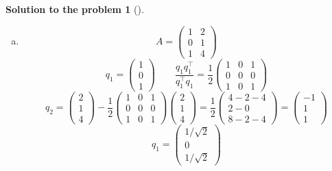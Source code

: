 \documentclass[12pt,a4]{article}
\newtheorem{solution}{Solution to the problem}
\begin{document}
\begin{solution}[]
\begin{enumerate}[(a)]
\[\begin{pmatrix}
\end{pmatrix}
\]
\[
\Rightarrow A = 
\begin{pmatrix}
1 & -1 \\
2 & 3
\end{pmatrix}
=
\begin{pmatrix}
1/\sqrt5 & -2/\sqrt5 \\
2/\sqrt5 & 1/\sqrt5
\end{pmatrix}
\begin{pmatrix}
\sqrt 5 & \sqrt 5 \\
0 & \sqrt 5 \\
\end{pmatrix}
\]
\item
\[
A =
\begin{pmatrix}
1 & 2 \\
0 & 1 \\
1 & 4 \end{pmatrix}
\]
\[
q_1 = \begin{pmatrix} 1 \\ 0 \\ 1  \end{pmatrix}
\qquad
\frac{q_1 q_1^\top}{q_1^\top q_1} =
\frac{1}{2}
\begin{pmatrix} 1 & 0 & 1 \\ 0 & 0 & 0 \\ 1 & 0 & 1 \end{pmatrix}
\]
\[
q_2 = \begin{pmatrix} 2 \\ 1 \\ 4  \end{pmatrix} -
\frac{1}{2}
\begin{pmatrix} 1 & 0 & 1 \\ 0 & 0 & 0 \\ 1 & 0 & 1 \end{pmatrix}
\begin{pmatrix} 2 \\ 1 \\ 4  \end{pmatrix}
=
\frac{1}{2}
\begin{pmatrix} 4 - 2 - 4 \\ 2 - 0 \\ 8 - 2 - 4 \end{pmatrix}
=
\begin{pmatrix} - 1 \\ 1 \\ 1 \end{pmatrix}
\]
\[
\hat q_1 = \begin{pmatrix} 1/\sqrt 2 \\ 0 \\ 1/\sqrt 2  \end{pmatrix}
\]
\end{enumerate}
\end{solution}
\end{document}
